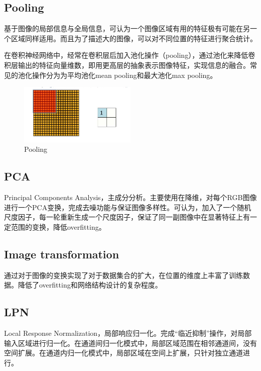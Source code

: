 \documentclass[12pt]{article}
\begin{document}
\subsection{Pooling}
基于图像的局部信息与全局信息，可认为一个图像区域有用的特征极有可能在另一个区域同样适用。而且为了描述大的图像，可以对不同位置的特征进行聚合统计。

在卷积神经网络中，经常在卷积层后加入池化操作（pooling），通过池化来降低卷积层输出的特征向量维数，即用更高层的抽象表示图像特征，实现信息的融合。常见的池化操作分为为平均池化mean pooling和最大池化max pooling。
\begin{figure}[!ht]
\centering
\includegraphics[width=0.5\textwidth]{pooling}
\caption{Pooling}
\end{figure}

\subsection{PCA}
Principal Components Analysis，主成分分析。主要使用在降维，对每个RGB图像进行一个PCA变换，完成去噪功能与保证图像多样性。可认为，加入了一个随机尺度因子，每一轮重新生成一个尺度因子，保证了同一副图像中在显著特征上有一定范围的变换，降低overfitting。

\subsection{Image transformation}
通过对于图像的变换实现了对于数据集合的扩大，在位置的维度上丰富了训练数据。降低了overfitting和网络结构设计的复杂程度。

\subsection{LPN}
Local Response Normalization，局部响应归一化。完成``临近抑制''操作，对局部输入区域进行归一化。在通道间归一化模式中，局部区域范围在相邻通道间，没有空间扩展。在通道内归一化模式中，局部区域在空间上扩展，只针对独立通道进行。
\end{document}
